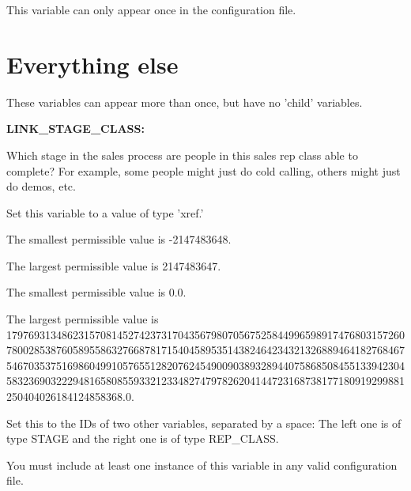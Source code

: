 This variable can only appear once in the configuration file.


\section{Everything else}


These variables can appear more than once, but have no 'child' variables.


\textbf{LINK\_STAGE\_CLASS:}


Which stage in the sales process are people in this sales rep class able to complete?  For example, some people might just do cold calling, others might just do demos, etc.

Set this variable to a value of type 'xref.'

The smallest permissible value is -2147483648.

The largest permissible value is 2147483647.

The smallest permissible value is 0.0.

The largest permissible value is 179769313486231570814527423731704356798070567525844996598917476803157260780028538760589558632766878171540458953514382464234321326889464182768467546703537516986049910576551282076245490090389328944075868508455133942304583236903222948165808559332123348274797826204144723168738177180919299881250404026184124858368.0.

Set this to the IDs of two other variables, separated by a space:  The left one is of type STAGE and the right one is of type REP\_CLASS.

You must include at least one instance of this variable in any valid configuration file.

\LastPage{}


